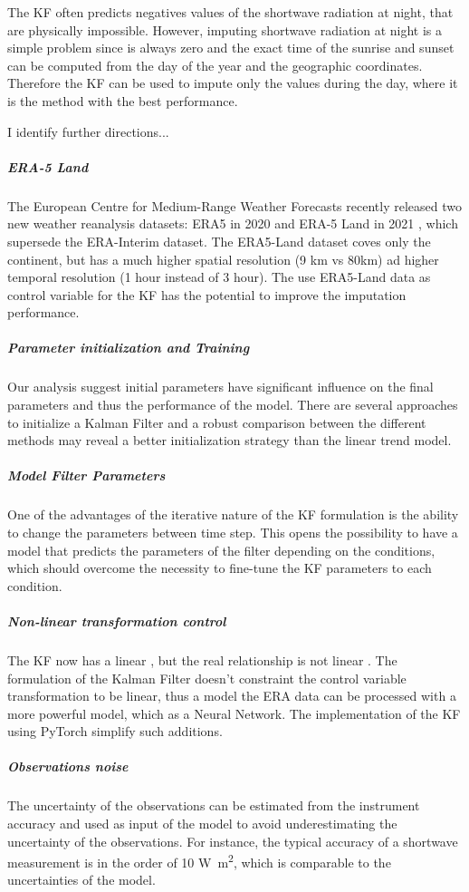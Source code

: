 \documentclass{article}
\begin{document}
The KF often predicts negatives values of the shortwave radiation at night, that are physically impossible. However, imputing shortwave radiation at night is a simple problem since is always zero and the exact time of the sunrise and sunset can be computed from the day of the year and the geographic coordinates. Therefore the KF can be used to impute only the values during the day, where it is the method with the best performance.

I identify further directions...

\subparagraph{ERA-5 Land} The European Centre for Medium-Range Weather Forecasts recently released two new weather reanalysis datasets: ERA5 in 2020 \cite{hersbach_era5_2020} and ERA-5 Land  in 2021 \cite{munoz-sabater_era5-land_2021}, which supersede the ERA-Interim dataset. The ERA5-Land dataset coves only the continent, but has a much higher spatial resolution (9 km vs 80km) ad higher temporal resolution (1 hour instead of 3 hour). The use ERA5-Land data as control variable for the KF has the potential to improve the imputation performance.

\subparagraph{Parameter initialization and Training} Our analysis suggest initial parameters have significant influence on the final parameters and thus the performance of the model. There are several approaches to initialize a Kalman Filter \cite{durbin_time_2012-4} and a robust comparison between the different methods may reveal a better initialization strategy than the linear trend model.  

\subparagraph{Model Filter Parameters} One of the advantages of the iterative nature of the KF formulation is the ability to change the parameters between time step. This opens the possibility to have a model that predicts the parameters of the filter depending on the conditions, which should overcome the necessity to fine-tune the KF parameters to each condition. 

\subparagraph{Non-linear transformation control} The KF now has a linear , but the real relationship is not linear . The formulation of the Kalman Filter doesn't constraint the control variable transformation to be linear, thus a model the ERA data can be processed with a more powerful model, which as a Neural Network. The implementation of the KF using PyTorch simplify such additions.

\subparagraph{Observations noise} The uncertainty of the observations can be estimated from the instrument accuracy and used as input of the model to avoid underestimating the uncertainty of the observations. For instance, the typical accuracy of a shortwave measurement is in the order of 10 \si{W\m^2}, which is comparable to the uncertainties of the model.
\end{document}
